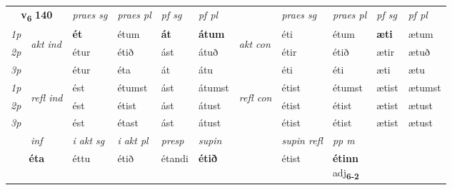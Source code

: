 \noindent
\begin{tabular}{lllllllllll} \toprule
\multicolumn{2}{c}{\textbf{v{\textsubscript{6}}} \Large{\textbf{140}}}  &  \textit{praes sg}  & \textit{praes pl}  &\textit{ pf sg} & \textit{pf pl} &  &  \textit{praes sg}  & \textit{praes pl}  & \textit{pf sg} & \textit{pf pl } \\*
	\cmidrule{3-6} \cmidrule{8-11}
 {\textit{1p}} & \multirow{3}{*}{\begin{turn}{90}\textit{akt ind}\end{turn}} & \textbf{ét} & étum & \textbf{át} & \textbf{átum} & \multirow{3}{*}{\begin{turn}{90}\textit{akt con}\end{turn}} &éti & étum & \textbf{æti} & ætum\\*
 {\textit{2p}} &  &  étur  & étið & ást & átuð & & étir & étið & ætir & ætuð \\*
{\textit{3p}} &  & étur & éta & át & átu & & éti & éti& æti & ætu \\*
\cmidrule{3-6} \cmidrule{8-11}
 {\textit{1p}} & \multirow{3}{*}{\begin{turn}{90}\textit{refl ind}\end{turn}}  & ést & étumst & ást & átumst & \multirow{3}{*}{\begin{turn}{90}\textit{refl con}\end{turn}}  &étist & étumst & ætist & ætumst \\*
 {\textit{2p}} &  & ést & étist & ást & átust & &étist & étist & ætist & ætust \\*
 {\textit{3p}}  & & ést & étast & ást & átust & & étist & étist& ætist & ætust \\*
\cmidrule{3-6} \cmidrule{8-11}

   \multicolumn{2}{c}{\textit{inf}}  & \textit{i akt sg} & \textit{i akt pl}   & \textit{presp} & \textit{supin} && \textit{supin refl} & \textit{pp m} \\*
  \multicolumn{2}{c}{\textbf{éta}} & éttu  & étið   & étandi &  \textbf{étið} && étist & \specialcell{\textbf{étinn} \\ adj\textbf{\textsubscript{6-2}}} \\*
\end{tabular}

